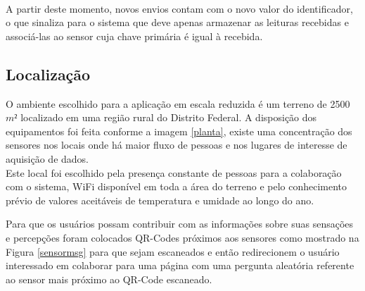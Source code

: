 \\\null \quad A partir deste momento, novos envios contam com o novo valor do identificador, o que sinaliza para o sistema que deve apenas armazenar as leituras recebidas e associá-las ao sensor cuja chave primária é igual à recebida.



\subsection{Localização}
\quad O ambiente escolhido para a aplicação em escala reduzida é um terreno de 2500 $m²$ localizado em uma
região rural do Distrito Federal. A disposição dos equipamentos foi feita conforme a imagem \ref{planta},
existe uma concentração dos sensores nos locais onde há maior fluxo de pessoas e nos lugares de interesse de
aquisição de dados.
\\\null \quad Este local foi escolhido pela presença constante de pessoas para a colaboração com o sistema, WiFi disponível em toda a área do terreno e pelo conhecimento prévio de valores aceitáveis de temperatura
  e umidade ao longo do ano.
\newpage


Para que os usuários possam contribuir com as informações sobre suas sensações e percepções foram colocados QR-Codes próximos aos sensores como mostrado na Figura \ref{sensormsg} para que sejam escaneados e então redirecionem o usuário interessado em colaborar para uma página com uma pergunta aleatória referente ao sensor mais próximo ao QR-Code escaneado.


